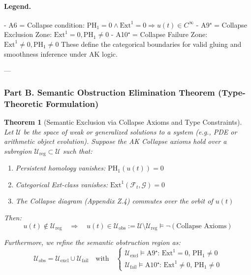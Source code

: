 \documentclass[11pt]{article}
\newtheorem{theorem}{Theorem}[section]
\begin{document}
\begin{axiom}
\begin{axiom}
{{\paragraph{Legend.}
- A6 = Collapse condition: \( \mathrm{PH}_1 = 0 \wedge \mathrm{Ext}^1 = 0 \Rightarrow u(t) \in C^\infty \)
- A9⁺ = Collapse Exclusion Zone: \( \mathrm{Ext}^1 = 0, \mathrm{PH}_1 \neq 0 \)  
- A10⁺ = Collapse Failure Zone: \( \mathrm{Ext}^1 \neq 0, \mathrm{PH}_1 \neq 0 \)  
These define the categorical boundaries for valid gluing and smoothness inference under AK logic.

---

\subsubsection*{Part B. Semantic Obstruction Elimination Theorem (Type-Theoretic Formulation)}

\begin{theorem}[Semantic Exclusion via Collapse Axioms and Type Constraints]
Let \( \mathcal{U} \) be the space of weak or generalized solutions to a system (e.g., PDE or arithmetic object evolution).  
Suppose the AK Collapse axioms hold over a subregion \( \mathcal{U}_{\mathrm{reg}} \subset \mathcal{U} \) such that:

\begin{enumerate}
  \item Persistent homology vanishes: \( \mathrm{PH}_1(u(t)) = 0 \)
  \item Categorical Ext-class vanishes: \( \mathrm{Ext}^1(\mathcal{F}_t, \mathcal{G}) = 0 \)
  \item The Collapse diagram (Appendix Z.4) commutes over the orbit of \( u(t) \)
\end{enumerate}

Then:
\[
u(t) \notin \mathcal{U}_{\mathrm{reg}} \quad \Rightarrow \quad u(t) \in \mathcal{U}_{\mathrm{obs}} := \mathcal{U} \setminus \mathcal{U}_{\mathrm{reg}} \models \neg(\text{Collapse Axioms})
\]

Furthermore, we refine the semantic obstruction region as:
\[
\mathcal{U}_{\mathrm{obs}} = \mathcal{U}_{\mathrm{excl}} \cup \mathcal{U}_{\mathrm{fail}}
\quad \text{with} \quad
\begin{cases}
\mathcal{U}_{\mathrm{excl}} \models \text{A9⁺: } \mathrm{Ext}^1 = 0,\, \mathrm{PH}_1 \neq 0 \\
\mathcal{U}_{\mathrm{fail}} \models \text{A10⁺: } \mathrm{Ext}^1 \neq 0,\, \mathrm{PH}_1 \neq 0
\end{cases}
\]


\end{theorem}}}
\end{axiom}
\end{axiom}
\end{document}
